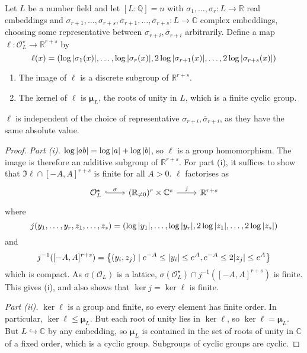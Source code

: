 Let \( L \) be a number field and let \( [L:\mathbb Q] = n \) with \( \sigma_1, \dots, \sigma_r \colon L \to \mathbb R \) real embeddings and \( \sigma_{r+1}, \dots, \sigma_{r+s}, \overline\sigma_{r+1}, \dots, \overline\sigma_{r+s} \colon L \to \mathbb C \) complex embeddings, choosing some representative between \( \sigma_{r+i}, \overline \sigma_{r+i} \) arbitrarily.
Define a map \( \ell \colon \mathcal O_L^\star \to \mathbb R^{r+s} \) by
\[ \ell(x) = (\log \abs{\sigma_1(x)}, \dots, \log\abs{\sigma_r(x)}, 2\log\abs{\sigma_{r+1}(x)}, \dots, 2\log\abs{\sigma_{r+s}(x)}) \]
\begin{lemma}
    \begin{enumerate}
        \item The image of \( \ell \) is a discrete subgroup of \( \mathbb R^{r+s} \).
        \item The kernel of \( \ell \) is \( \bm \mu_L \), the roots of unity in \( L \), which is a finite cyclic group.
    \end{enumerate}
\end{lemma}
\begin{remark}
    \( \ell \) is independent of the choice of representative \( \sigma_{r+i}, \overline\sigma_{r+i} \), as they have the same absolute value.
\end{remark}
\begin{proof}
    \emph{Part (i).}
    \( \log \abs{ab} = \log \abs{a} + \log \abs{b} \), so \( \ell \) is a group homomorphism.
    The image is therefore an additive subgroup of \( \mathbb R^{r+s} \).
    For part (i), it suffices to show that \( \Im \ell \cap [-A,A]^{r+s} \) is finite for all \( A > 0 \).
    \( \ell \) factorises as
    \[\begin{tikzcd}
        {\mathcal O_L^\star} & {(\mathbb R_{\neq 0})^r \times \mathbb C^s} & {\mathbb R^{r+s}}
        \arrow["\sigma", hook, from=1-1, to=1-2]
        \arrow["j", from=1-2, to=1-3]
    \end{tikzcd}\]
    where
    \[ j(y_1, \dots, y_r, z_1, \dots, z_s) = (\log \abs{y_1}, \dots, \log \abs{y_r}, 2\log\abs{z_1}, \dots, 2\log \abs{z_s}) \]
    and
    \[ j^{-1}([-A,A]^{r+s}) = \qty{(y_i, z_j) \mid e^{-A} \leq \abs{y_i} \leq e^A, e^{-A} \leq 2\abs{z_j} \leq e^A} \]
    which is compact.
    As \( \sigma(\mathcal O_L) \) is a lattice, \( \sigma(\mathcal O_L^\star) \cap j^{-1}([-A,A]^{r+s}) \) is finite.
    This gives (i), and also shows that \( \ker j = \ker \ell \) is finite.

    \emph{Part (ii).}
    \( \ker \ell \) is a group and finite, so every element has finite order.
    In particular, \( \ker \ell \leq \bm \mu_L \).
    But each root of unity lies in \( \ker \ell \), so \( \ker \ell = \bm\mu_L \).
    But \( L \hookrightarrow \mathbb C \) by any embedding, so \( \bm\mu_L \) is contained in the set of roots of unity in \( \mathbb C \) of a fixed order, which is a cyclic group.
    Subgroups of cyclic groups are cyclic.
\end{proof}
